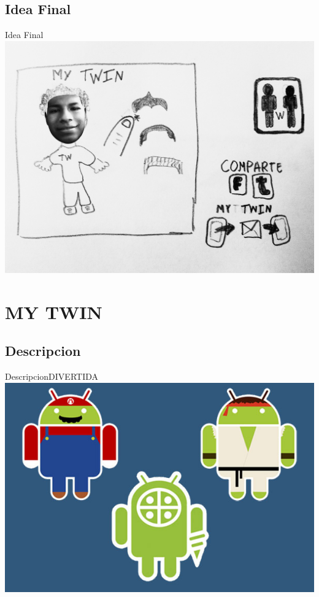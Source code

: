 \documentclass{beamer}
\begin{document}
\subsection{Idea Final}

\begin{frame}{Idea Final}
\center
\vspace{-0.15in}
\includegraphics[scale=0.1]{idea.jpg}

\end{frame}




\section{MY TWIN}

\subsection{Descripcion}

\begin{frame}{Descripcion}{DIVERTIDA}
\hspace{0.06in}\includegraphics[scale=0.5]{442.jpg}
\end{frame}
\end{document}
